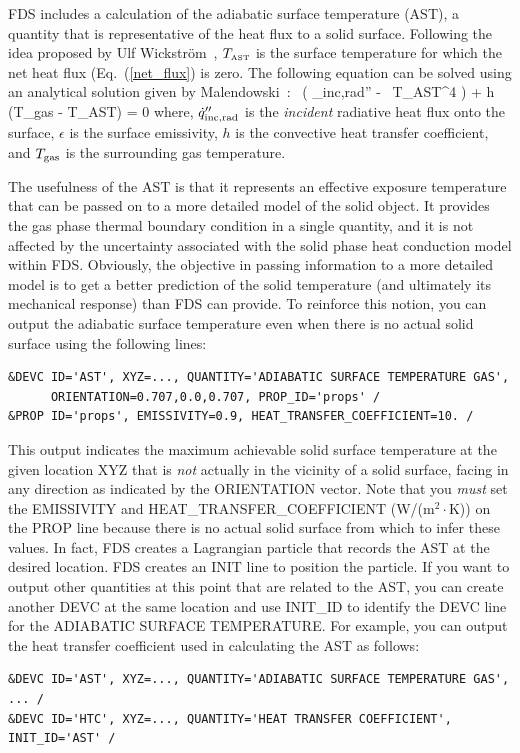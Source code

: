 \documentclass[11pt]{book}
\begin{document}
FDS includes a calculation of the adiabatic surface temperature (AST), a quantity that is representative of the heat flux to a solid surface. Following the idea proposed by Ulf Wickstr\"{o}m~\cite{Wickstrom:Interflam2007}, $T_{\hbox{\tiny AST}}$ is the surface temperature for which the net heat flux (Eq.~(\ref{net_flux}) is zero. The following equation can be solved using an analytical solution given by Malendowski~\cite{Malendowski:FT}:
\be
   \epsilon \, \left( \dq_{\rm inc,rad}'' - \sigma \, T_{\hbox{\tiny AST}}^4 \right) + h \, (T_{\rm gas} - T_{\hbox{\tiny AST}}) = 0
\ee
where, $\dot{q}_{\rm inc,rad}''$ is the {\em incident} radiative heat flux onto the surface, $\epsilon$ is the surface emissivity, $h$ is the convective heat transfer coefficient, and $T_{\rm gas}$ is the surrounding gas temperature.

The usefulness of the AST is that it represents an effective exposure temperature that can be passed on to a more detailed model of the solid object. It provides the gas phase thermal boundary condition in a single quantity, and it is not affected by the uncertainty associated with the solid phase heat conduction model within FDS. Obviously, the objective in passing information to a more detailed model is to get a better prediction of the solid temperature (and ultimately its mechanical response) than FDS can provide. To reinforce this notion, you can output the adiabatic surface temperature even when there is no actual solid surface using the following lines:
\begin{lstlisting}
&DEVC ID='AST', XYZ=..., QUANTITY='ADIABATIC SURFACE TEMPERATURE GAS',
      ORIENTATION=0.707,0.0,0.707, PROP_ID='props' /
&PROP ID='props', EMISSIVITY=0.9, HEAT_TRANSFER_COEFFICIENT=10. /
\end{lstlisting}
This output indicates the maximum achievable solid surface temperature at the given location {\ct XYZ} that is \emph{not} actually in the vicinity of a solid surface, facing in any direction as indicated by the {\ct ORIENTATION} vector. Note that you {\em must} set the {\ct EMISSIVITY} and {\ct HEAT\_TRANSFER\_COEFFICIENT} (W/(m$^2\cdot$K)) on the {\ct PROP} line because there is no actual solid surface from which to infer these values.
In fact, FDS creates a Lagrangian particle that records the AST at the desired location. FDS creates an {\ct INIT} line to position the particle. If you want to output other quantities at this point that are related to the AST, you can create another {\ct DEVC} at the same location and use {\ct INIT\_ID} to identify the {\ct DEVC} line for the {\ct ADIABATIC SURFACE TEMPERATURE}. For example, you can output the heat transfer coefficient used in calculating the AST as follows:
\begin{lstlisting}
&DEVC ID='AST', XYZ=..., QUANTITY='ADIABATIC SURFACE TEMPERATURE GAS', ... /
&DEVC ID='HTC', XYZ=..., QUANTITY='HEAT TRANSFER COEFFICIENT', INIT_ID='AST' /
\end{lstlisting}
\end{document}
